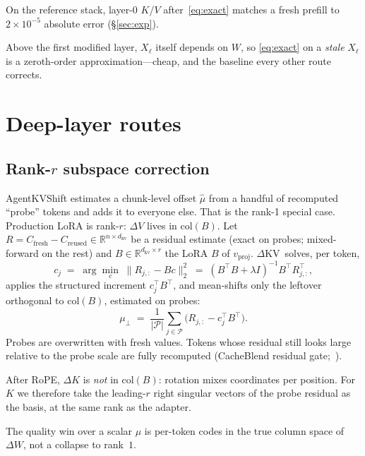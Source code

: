 \documentclass{article}
\newcommand{\dkv}{$\Delta$KV}
\begin{document}
On the reference stack, layer-0 $K$/$V$ after~\eqref{eq:exact} matches a
fresh prefill to $2{\times}10^{-5}$ absolute error
(\S\ref{sec:exp}).

Above the first modified layer, $X_\ell$ itself depends on $W$, so
\eqref{eq:exact} on a \emph{stale} $X_\ell$ is a zeroth-order
approximation---cheap, and the baseline every other route corrects.

\section{Deep-layer routes}
\label{sec:deep}

\subsection{Rank-\texorpdfstring{$r$}{r} subspace correction}
\label{sec:subspace}

AgentKVShift estimates a chunk-level offset $\hat\mu$ from a handful of
recomputed ``probe'' tokens and adds it to everyone else.
That is the rank-1 special case.
Production LoRA is rank-$r$: $\Delta V$ lives in $\mathrm{col}(B)$.
Let $R = C_{\mathrm{fresh}}-C_{\mathrm{reused}}\in\mathbb{R}^{n\times d_{\mathrm{kv}}}$
be a residual estimate (exact on probes; mixed-forward on the rest) and
$B\in\mathbb{R}^{d_{\mathrm{kv}}\times r}$ the LoRA $B$ of $v_{\mathrm{proj}}$.
\dkv\ solves, per token,
\begin{equation}
  \label{eq:ls}
  c_j \;=\; \arg\min_{c}\; \bigl\| R_{j,:} - B c \bigr\|_2^2
  \;=\; (B^\top B+\lambda I)^{-1} B^\top R_{j,:}^\top,
\end{equation}
applies the structured increment $c_j^\top B^\top$, and mean-shifts only
the leftover orthogonal to $\mathrm{col}(B)$, estimated on probes:
\begin{equation}
  \mu_\perp \;=\; \frac{1}{|{\mathcal P}|}\sum_{j\in{\mathcal P}}
  \bigl(R_{j,:}-c_j^\top B^\top\bigr).
\end{equation}
Probes are overwritten with fresh values.
Tokens whose residual still looks large relative to the probe scale are
fully recomputed (CacheBlend residual gate;~\citealp{yao2024cacheblend}).

After RoPE, $\Delta K$ is \emph{not} in $\mathrm{col}(B)$: rotation mixes
coordinates per position.
For $K$ we therefore take the leading-$r$ right singular vectors of the
probe residual as the basis, at the same rank as the adapter.

The quality win over a scalar $\mu$ is per-token codes in the true
column space of $\Delta W$, not a collapse to rank~$1$.
\end{document}
